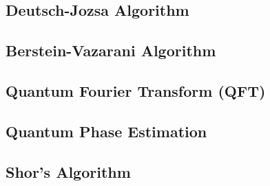 \documentclass{article}
\begin{document}
\subsection{Deutsch-Jozsa Algorithm}
\subsection{Berstein-Vazarani Algorithm}
\subsection{Quantum Fourier Transform (QFT)}
\subsection{Quantum Phase Estimation}
\subsection{Shor's Algorithm}
\end{document}
